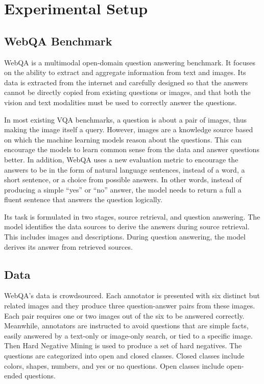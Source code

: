 \documentclass[nohyperref]{article}
\theoremstyle{plain}
\theoremstyle{definition}
\theoremstyle{remark}
\begin{document}
    \section{Experimental Setup}

    \subsection{WebQA Benchmark}

    WebQA \cite{webqa} is a multimodal open-domain question answering benchmark.
    It focuses on the ability to extract and aggregate information from text and images.
    Its data is extracted from the internet and carefully designed so that the answers cannot be directly copied from
    existing questions or images, and that both the vision and text modalities must be used to correctly
    answer the questions.

    In most existing VQA benchmarks, a question is about a pair of images, thus making the image itself a query.
    However, images are a knowledge source based on which the machine learning models reason about the questions.
    This can encourage the models to learn common sense from the data and answer questions better.
    In addition, WebQA uses a new evaluation metric to encourage the answers to be in the form of natural language
    sentences, instead of a word, a short sentence, or a choice from possible answers.
    In other words, instead of producing a simple ``yes'' or ``no'' answer, the model needs to return a full
    a fluent sentence that answers the question logically.

    Its task is formulated in two stages, source retrieval, and question answering.
    The model identifies the data sources to derive the answers during source retrieval.
    This includes images and descriptions.
    During question answering, the model derives its answer from retrieved sources.

    \subsection{Data}

    WebQA's data is crowdsourced.
    Each annotator is presented with six distinct but related images and they produce three question-answer pairs from these
    images.
    Each pair requires one or two images out of the six to be answered correctly.
    Meanwhile, annotators are instructed to avoid questions that are simple facts, easily answered by a text-only or
    image-only search, or tied to a specific image.
    Then Hard Negative Mining is used to produce a set of hard negatives.
    The questions are categorized into open and closed classes.
    Closed classes include colors, shapes, numbers, and yes or no questions.
    Open classes include open-ended questions.
\end{document}
